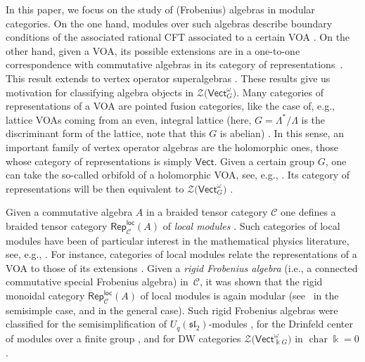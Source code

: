 \documentclass[10pt,a4paper]{amsart}
\numberwithin{equation}{section}
\newcommand{\cha}{\operatorname{char}}
\newcommand{\locmod}{\mathsf{Rep}^{\mathsf{loc}}}
\newcommand{\Vect}{\mathsf{Vect}}
\newcommand{\cC}{\mathcal{C}}
\newcommand{\cZ}{\mathcal{Z}}
\begin{document}
In this paper, we focus on the study of (Frobenius) algebras in modular categories. On the one hand, modules over such algebras describe boundary conditions of the associated rational CFT associated to a certain VOA \cite{FFRS,FRS}. On the other hand, given a VOA, its possible extensions are in a one-to-one correspondence with commutative algebras in its category of representations~\cite{HKL}. This result extends to vertex operator superalgebras \cite{CKM}. These results give us motivation for classifying algebra objects in $\cZ\big(\Vect_G^\omega\big)$. Many categories of representations of a VOA are pointed fusion categories, like the case of, e.g., lattice VOAs coming from an even, integral lattice (here, $G=\Lambda^*/\Lambda$ is the discriminant form of the lattice, note that this $G$ is abelian) \cite{DL,Len}. In this sense, an important family of vertex operator algebras are the holomorphic ones, those whose category of representations is simply $\Vect$. Given a certain group $G$, one can take the so-called orbifold of a holomorphic VOA, see, e.g., \cite{DongRenXu, Moeller}. Its category of representations will be then equivalent to $\cZ\big(\Vect_G^\omega\big)$ \cite{McRae}.


Given a commutative algebra $A$ in a braided tensor category $\cC$ one defines a braided tensor category $\locmod_\cC(A)$ of \emph{local modules} \cite{KO,LW3,Par,Sch}. Such categories of local modules have been of particular interest in the mathematical physics literature, see, e.g., \cite{FFRS, FRS}.
For instance, categories of local modules relate the representations of a VOA to those of its extensions \cite{CKM,HKL, KO}. Given a \emph{rigid Frobenius algebra} (i.e., a connected commutative special Frobenius algebra) in~$\cC$, it was shown that the rigid monoidal category $\locmod_\cC(A)$ of local modules is again modular (see~\cite{KO} in the semisimple case, and \cite{LW3} in the general case). Such rigid Frobenius algebras were classified for the semisimplification of $U_q(\mathfrak{sl}_2)$-modules \cite{KO}, for the Drinfeld center of modules over a finite group \cite{Dav3,LW3}, and for DW categories $\cZ\big(\Vect_{\Bbbk G}^\omega\big)$ in $\cha\Bbbk=0$ \cite{DS}.
\end{document}
